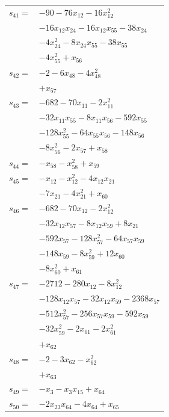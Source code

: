 \begin{longtable}{@{}r@{\;}l@{}}
\(s_{41}=\) & \(\displaystyle -90 -76x_{12} -16x_{12}^{2}\) \\
 & \(\displaystyle -16x_{12}x_{24} -16x_{12}x_{55} -38x_{24}\) \\
 & \(\displaystyle -4x_{24}^{2} -8x_{24}x_{55} -38x_{55}\) \\
 & \(\displaystyle -4x_{55}^{2} +x_{56}\) \\[3pt]
\(s_{42}=\) & \(\displaystyle -2 -6x_{48} -4x_{48}^{2}\) \\
 & \(\displaystyle +x_{57}\) \\[3pt]
\(s_{43}=\) & \(\displaystyle -682 -70x_{11} -2x_{11}^{2}\) \\
 & \(\displaystyle -32x_{11}x_{55} -8x_{11}x_{56} -592x_{55}\) \\
 & \(\displaystyle -128x_{55}^{2} -64x_{55}x_{56} -148x_{56}\) \\
 & \(\displaystyle -8x_{56}^{2} -2x_{57} +x_{58}\) \\[3pt]
\(s_{44}=\) & \(\displaystyle -x_{58} -x_{58}^{2} +x_{59}\) \\[3pt]
\(s_{45}=\) & \(\displaystyle -x_{12} -x_{12}^{2} -4x_{12}x_{21}\) \\
 & \(\displaystyle -7x_{21} -4x_{21}^{2} +x_{60}\) \\[3pt]
\(s_{46}=\) & \(\displaystyle -682 -70x_{12} -2x_{12}^{2}\) \\
 & \(\displaystyle -32x_{12}x_{57} -8x_{12}x_{59} +8x_{21}\) \\
 & \(\displaystyle -592x_{57} -128x_{57}^{2} -64x_{57}x_{59}\) \\
 & \(\displaystyle -148x_{59} -8x_{59}^{2} +12x_{60}\) \\
 & \(\displaystyle -8x_{60}^{2} +x_{61}\) \\[3pt]
\(s_{47}=\) & \(\displaystyle -2712 -280x_{12} -8x_{12}^{2}\) \\
 & \(\displaystyle -128x_{12}x_{57} -32x_{12}x_{59} -2368x_{57}\) \\
 & \(\displaystyle -512x_{57}^{2} -256x_{57}x_{59} -592x_{59}\) \\
 & \(\displaystyle -32x_{59}^{2} -2x_{61} -2x_{61}^{2}\) \\
 & \(\displaystyle +x_{62}\) \\[3pt]
\(s_{48}=\) & \(\displaystyle -2 -3x_{62} -x_{62}^{2}\) \\
 & \(\displaystyle +x_{63}\) \\[3pt]
\(s_{49}=\) & \(\displaystyle -x_{3} -x_{3}x_{15} +x_{64}\) \\[3pt]
\(s_{50}=\) & \(\displaystyle -2x_{23}x_{64} -4x_{64} +x_{65}\) \\[3pt]

\end{longtable}
